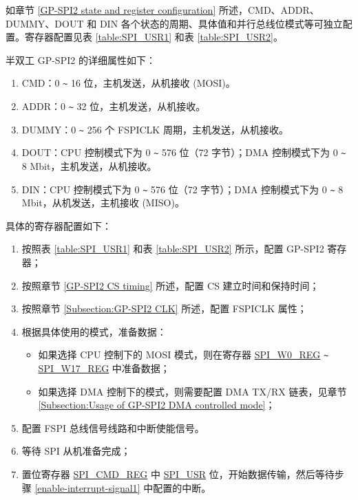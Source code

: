 \documentclass[main\_\_CN.tex]{subfiles}
\begin{document}
如章节 \ref{GP-SPI2 state and register configuration} 所述，CMD、ADDR、DUMMY、DOUT 和 DIN 各个状态的周期、具体值和并行总线位模式等可独立配置。寄存器配置见表 \ref{table:SPI_USR1} 和表 \ref{table:SPI_USR2}。

半双工 GP-SPI2 的详细属性如下：

\begin{enumerate}
    \item CMD：0 \verb+~+ 16 位，主机发送，从机接收 (MOSI)。
    \item ADDR：0 \verb+~+ 32 位，主机发送，从机接收。
    \item DUMMY：0 \verb+~+ 256 个 FSPICLK 周期，主机发送，从机接收。
    \item DOUT：CPU 控制模式下为 0 \verb+~+ 576 位（72 字节）；DMA 控制模式下为 0 \verb+~+ 8 Mbit，主机发送，从机接收。
    \item DIN：CPU 控制模式下为 0 \verb+~+ 576 位（72 字节）；DMA 控制模式下为 0 \verb+~+ 8 Mbit，从机发送，主机接收 (MISO)。
\end{enumerate}

具体的寄存器配置如下：
\begin{enumerate}
    \item 按照表 \ref{table:SPI_USR1} 和表 \ref{table:SPI_USR2} 所示，配置 GP-SPI2 寄存器；

    \item 按照章节 \ref{GP-SPI2 CS timing} 所述，配置 CS 建立时间和保持时间；

    \item 按照章节 \ref{Subsection:GP-SPI2 CLK} 所述，配置 FSPICLK 属性；

    \item 根据具体使用的模式，准备数据：
    \begin{itemize}
        \item 如果选择 CPU 控制下的 MOSI 模式，则在寄存器 \hyperref[regdesc:SPIW0REG]{SPI\_W0\_REG} \verb+~+ \hyperref[regdesc:SPIW17REG]{SPI\_W17\_REG} 中准备数据；
        \item 如果选择 DMA 控制下的模式，则需要配置 DMA TX/RX 链表，见章节 \ref{Subsection:Usage of GP-SPI2 DMA controlled mode}；
    \end{itemize}
    \item 配置 FSPI 总线信号线路和中断使能信号。\label{enable-interrupt-signal1}

    \item 等待 SPI 从机准备完成；

    \item 置位寄存器 \hyperref[regdesc:SPICMDREG]{SPI\_CMD\_REG} 中 \hyperref[fielddesc:SPIUSR]{SPI\_USR} 位，开始数据传输，然后等待步骤 \ref{enable-interrupt-signal1} 中配置的中断。
\end{enumerate}
\end{document}
